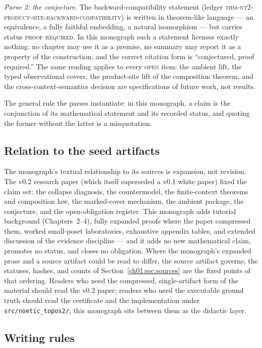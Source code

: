 \emph{Parse 2: the conjecture.} The backward-compatibility statement
(ledger \textsc{thm-nt2-product-site-backward-compatibility}) is written
in theorem-like language --- an equivalence, a fully faithful embedding, a
natural isomorphism --- but carries status \textsc{proof required}. In
this monograph such a statement licenses exactly nothing: no chapter may
use it as a premise, no summary may report it as a property of the
construction, and the correct citation form is ``conjectured, proof
required.'' The same reading applies to every \textsc{open} item: the
ambient lift, the typed observational covers, the product-site lift of the
composition theorem, and the cross-context-semantics decision are
specifications of future work, not results.

The general rule the parses instantiate: in this monograph, a claim is the
conjunction of its mathematical statement and its recorded status, and
quoting the former without the latter is a misquotation.

\subsection{Relation to the seed artifacts}\label{ch01:sec:seed-relation}

The monograph's textual relationship to its sources is expansion, not
revision. The v0.2 research paper (which itself superseded a v0.1 white
paper) fixed the claim set: the collapse diagnosis, the countermodel, the
finite-context theorems and composition law, the marked-cover mechanism,
the ambient package, the conjecture, and the open-obligation register.
This monograph adds tutorial background (Chapters~2--4), fully expanded
proofs where the paper compressed them, worked small-poset laboratories,
exhaustive appendix tables, and extended discussion of the evidence
discipline --- and it adds no new mathematical claim, promotes no status,
and closes no obligation. Where the monograph's expanded prose and a
source artifact could be read to differ, the source artifact governs; the
statuses, hashes, and counts of Section~\ref{ch01:sec:sources} are the
fixed points of that ordering. Readers who need the compressed,
single-artifact form of the material should read the v0.2 paper; readers
who need the executable ground truth should read the certificate and the
implementation under \texttt{src/noetic\_topos2/}; this monograph sits
between them as the didactic layer.

\subsection{Writing rules}\label{ch01:sec:rules}

